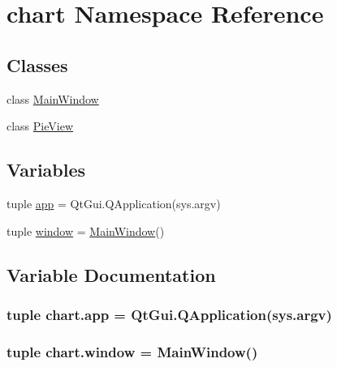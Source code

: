 \hypertarget{namespacechart}{}\section{chart Namespace Reference}
\label{namespacechart}
\subsection*{Classes}
\begin{DoxyCompactItemize}
\item 
class \hyperlink{classchart_1_1MainWindow}{Main\+Window}
\item 
class \hyperlink{classchart_1_1PieView}{Pie\+View}
\end{DoxyCompactItemize}
\subsection*{Variables}
\begin{DoxyCompactItemize}
\item 
tuple \hyperlink{namespacechart_aea82fb736a1d8a1b7cc8b5018f349425}{app} = Qt\+Gui.\+Q\+Application(sys.\+argv)
\item 
tuple \hyperlink{namespacechart_adf89be90d435330accc157bcbc70f635}{window} = \hyperlink{classchart_1_1MainWindow}{Main\+Window}()
\end{DoxyCompactItemize}


\subsection{Variable Documentation}
\hypertarget{namespacechart_aea82fb736a1d8a1b7cc8b5018f349425}{}
\subsubsection[{app}]{\setlength{\rightskip}{0pt plus 5cm}tuple chart.\+app = Qt\+Gui.\+Q\+Application(sys.\+argv)}\label{namespacechart_aea82fb736a1d8a1b7cc8b5018f349425}
\hypertarget{namespacechart_adf89be90d435330accc157bcbc70f635}{}
\subsubsection[{window}]{\setlength{\rightskip}{0pt plus 5cm}tuple chart.\+window = {\bf Main\+Window}()}\label{namespacechart_adf89be90d435330accc157bcbc70f635}
